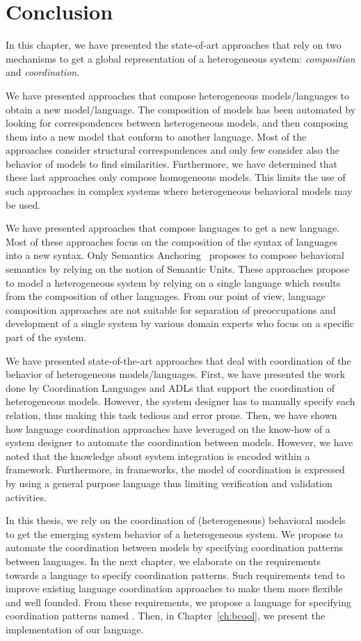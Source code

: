\section{Conclusion}
In this chapter, we have presented the state-of-art approaches that rely on two mechanisms to get a global representation of a heterogeneous system: \emph{composition} and \emph{coordination}. 

We have presented approaches that compose heterogeneous models/languages to obtain a new model/language. The composition of models has been automated by looking for correspondences between heterogeneous models, and then composing them into a new model that conform to another language. Most of the approaches consider structural correspondences and only few consider also the behavior of models to find similarities. Furthermore, we have determined that these last approaches only compose homogeneous models. This limits the use of such approaches in complex systems where heterogeneous behavioral models may be used. 

We have presented approaches that compose languages to get a new language. Most of these approaches focus on the composition of the syntax of languages into a new syntax. Only Semantics Anchoring~\cite{semanticsanchoring} proposes to compose behavioral semantics by relying on the notion of Semantic Units. These approaches propose to model a heterogeneous system by relying on a single language which results from the composition of other languages. From our point of view, language composition approaches are not suitable for separation of preoccupations and development of a single system by various domain experts who focus on a specific part of the system.

We have presented state-of-the-art approaches that deal with coordination of the behavior of heterogeneous models/languages. First, we have presented the work done by Coordination Languages and ADLs that support the coordination of heterogeneous models. However, the system designer has to manually specify each relation, thus making this task tedious and error prone. Then, we have shown how language coordination approaches have leveraged on the know-how of a system designer to automate the coordination between models. However, we have noted that the knowledge about system integration is encoded within a framework. Furthermore, in frameworks, the model of coordination is expressed by using a general purpose language thus limiting verification and validation activities. 

In this thesis, we rely on the coordination of (heterogeneous) behavioral models to get the emerging system behavior of a heterogeneous system. We propose to automate the coordination between models by specifying coordination patterns between languages. In the next chapter, we elaborate on the requirements towards a language to specify coordination patterns. Such requirements tend to improve existing language coordination approaches to make them more flexible and well founded. From these requirements, we propose a language for specifying coordination patterns named \bcool. Then, in Chapter~\ref{ch:bcool}, we present the implementation of our language.





